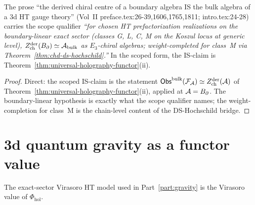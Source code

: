 \begin{proposition}
\label{prop:uhf-universal-scope}
The prose ``the derived chiral centre of a boundary algebra IS
the bulk algebra of a 3d HT gauge theory'' (Vol~II
preface.tex:26-39,1606,1765,1811; intro.tex:24-28) carries the
scope qualifier \emph{``for chosen HT prefactorization realizations on
the boundary-linear exact sector \textup{(}classes G, L, C, M on the
Koszul locus at generic level\textup{)},
$Z^{\mathrm{der}}_{\mathrm{ch}}(B_\partial) \simeq \mathcal{A}_{\mathrm{bulk}}$ as $E_3$-chiral algebras;
weight-completed for class~M via
Theorem~\ref*{thm:chd-ds-hochschild}.''} In the scoped form, the
IS-claim is Theorem~\ref{thm:universal-holography-functor}(ii).
\end{proposition}

\begin{proof}
Direct: the scoped IS-claim is the statement
$\mathsf{Obs}^{\mathrm{bulk}}(\mathcal{F}_{\mathcal{A}}) \simeq Z^{\mathrm{der}}_{\mathrm{ch}}(\mathcal{A})$ of
Theorem~\ref{thm:universal-holography-functor}(ii), applied at
$\mathcal{A} = B_\partial$. The boundary-linear hypothesis is exactly
what the scope qualifier names; the weight-completion for
class~M is the chain-level content of the DS-Hochschild bridge.
\end{proof}

\section{3d quantum gravity as a functor value}
\label{sec:uhf-gravity-theorem}

The exact-sector Virasoro HT model used in
Part~\ref*{part:gravity} is the Virasoro value of
$\Phi_{\mathrm{hol}}$.

